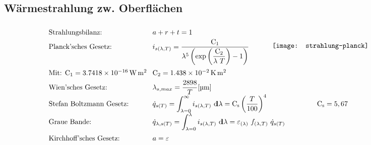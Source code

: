 \subsection{Wärmestrahlung zw. Oberflächen}
	\setlength{\abovedisplayskip}{-15pt}
	\[ \arraycolsep=0.4em  \def\arraystretch{1.7}
	\begin{array}{llc}
		\text{Strahlungsbilanz:}                          & a + r + t  =  1                                                                                                                                                                                     & \multirow{3}{6cm}{\texttt{[image: strahlung-planck]}} \\
		\text{Planck'sches Gesetz:}                       & i_{s(\lambda,T)}  =  \dfrac{\Cone}{\lambda^5\left(\exp\left( \dfrac{\Ctwo}{\lambda\ T} \right) - 1\right)}                                                                                          &                                                                         \\
		\text{Mit: } \Cone=\qty{3,7418e-16}{\W\m\squared} & \Ctwo = \qty{1,438e-2}{\K\m\squared}                                                                                                                                                                &                                                                         \\
		\text{Wien'sches Gesetz:}                         & \lambda_{s,max}  =  \dfrac{2898}{T}  [\unit{\micro\m}]                                                                                                                                              &                                                                         \\
		\text{Stefan Boltzmann Gesetz:}                   & \dot{q}_{s(T)}  =  \displaystyle\int_{\lambda = 0}^{\infty} i_{s(\lambda,T)} \ \dd \lambda  =  \Cs \left(\dfrac{T}{100}\right)^4                                                                    & \Cs  =  5,67                                                            \\
		\text{Graue Bande:}                               & \multicolumn{2}{l}{\dot{q}_{\lambda,s(T)}  =  \displaystyle\int_{\lambda = 0}^{\lambda} i_{s(\lambda,T)} \ \dd \lambda  = \varepsilon_{(\lambda)}\  f_{(\lambda,T)}\ \dot{q}_{s(T)}}                                                                                          \\
		\text{Kirchhoff'sches Gesetz:}                    & a = \varepsilon                                                                                                                                                                                     &                                                                         \\

\end{array}\]
